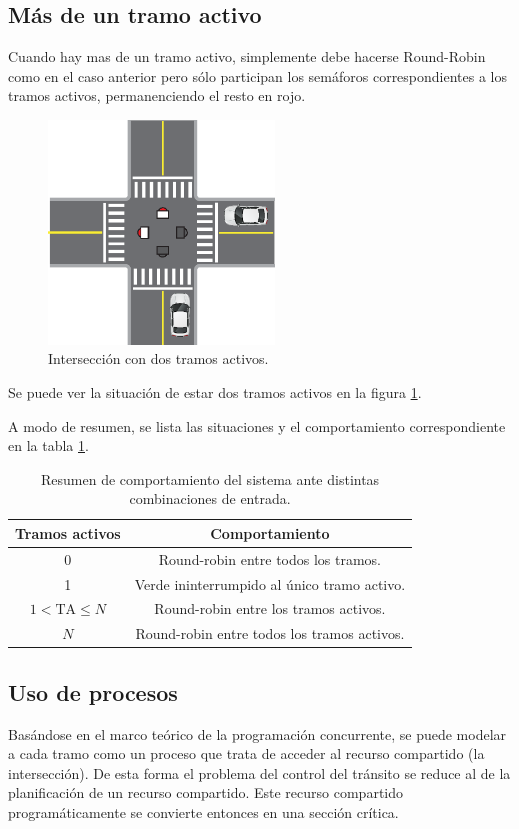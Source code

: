 \subsection{Más de un tramo activo}
Cuando hay mas de un tramo activo, simplemente debe hacerse Round-Robin como en el caso anterior pero sólo participan los semáforos correspondientes a los tramos activos, permanenciendo el resto en rojo.
\begin{figure}[htbp]
	\centering
	\includegraphics[width=6cm]{imagenes/dos-activos.eps}
	\caption{Intersección con dos tramos activos.}
	\label{fig:dos-activos}
\end{figure}

Se puede ver la situación de estar dos tramos activos en la figura \ref{fig:dos-activos}.

A modo de resumen, se lista las situaciones y el comportamiento correspondiente en la tabla \ref{tab:comportamiento}.

\begin{table}[htbp]
	\centering
	\caption{Resumen de comportamiento del sistema ante distintas combinaciones de entrada.}
	\vspace{0.25cm}
	\label{tab:comportamiento}
	\begin{tabular}{cc}
		\toprule
		\bf{Tramos activos} & \bf{Comportamiento} \\
		\midrule
		0 & Round-robin entre todos los tramos. \\
		1 & Verde ininterrumpido al único tramo activo. \\
		$1 < \mbox{TA} \le N$ & Round-robin entre los tramos activos. \\
		$N$ & Round-robin entre todos los tramos activos. \\
		\bottomrule
	\end{tabular}
\end{table}

\subsection{Uso de procesos}\label{sec:proc}
Basándose en el marco teórico de la programación concurrente, se puede modelar a cada tramo como un proceso que trata de acceder al recurso compartido (la intersección). De esta forma el problema del control del tránsito se reduce al de la planificación de un recurso compartido. Este recurso compartido programáticamente se convierte entonces en una sección crítica.


